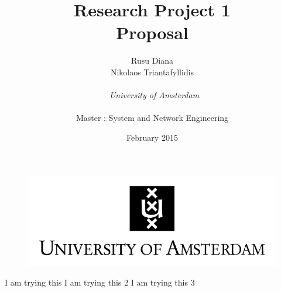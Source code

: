 \documentclass[11pt]{report}
\begin{document}
\begin{figure}[!t]
\centering
\includegraphics{images/uva.jpeg}
\end{figure}
\title{\textbf{Research Project 1 
} \\ Proposal}
\author{Rusu Diana \\ Nikolaos Triantafyllidis\\ \\
~\emph{University of Amsterdam 
        } \\ \\Master : System and Network Engineering}


\date{February 2015}

\maketitle

\tableofcontents




\begin{thebibliography}{1}
  I am trying this 
  I am trying this 2 
  I am trying this 3
\end{thebibliography}
\end{document}
